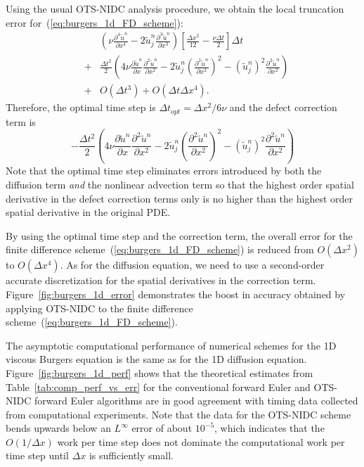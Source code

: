 \documentclass[fleqn,12pt,twoside]{article}
\newcommand{\beq}{\begin{equation}}
\newcommand{\eeq}{\end{equation}}
\newcommand{\bea}{\begin{eqnarray}}
\newcommand{\eea}{\end{eqnarray}}
\def\px{\partial x}
\def\tu{\tilde{u}}
\def\dt{\Delta t}
\def\dx{\Delta x}
\def\dto{\dt_{opt}}
\begin{document}
Using the usual OTS-NIDC analysis procedure, we obtain the local truncation
error for~(\ref{eq:burgers_1d_FD_scheme}): 
\bea
  & &
      \left( \nu \frac{\partial^4 \tu^n}{\px^4} 
           - 2 \tu^n_j \frac{\partial^3 \tu^n}{\px^3} \right)
      \left[ \frac{\dx^2}{12} - \frac{\nu \dt}{2}  \right] \dt
  \nonumber \\
  &+& \frac{\dt^2}{2} 
      \left( 
           4 \nu \frac{\partial \tu^n}{\px} \frac{\partial^2 \tu^n}{\px^2}
         - 2 \tu^n_j \left( \frac{\partial^2 \tu^n}{\px^2} \right)^2
         - \left(\tu^n_j\right)^2 \frac{\partial^2 \tu^n}{\px^2}
      \right) 
  \nonumber \\
  &+& O(\dt^3) + O(\dt \dx^4).
  \label{eq:burgers_1d_err_eqn}
\eea
Therefore, the optimal time step is $\dto = \dx^2/6\nu$ and the defect 
correction term is
\beq
  - \frac{\dt^2}{2} 
      \left( 
           4 \nu \frac{\partial \tu^n}{\px} \frac{\partial^2 \tu^n}{\px^2}
         - 2 \tu^n_j \left( \frac{\partial^2 \tu^n}{\px^2} \right)^2
         - \left(\tu^n_j\right)^2 \frac{\partial^2 \tu^n}{\px^2}
      \right)
  \label{eq:burgers_1d_corr_term}
\eeq 
Note that the optimal time step eliminates errors introduced by 
both the diffusion term \emph{and} the nonlinear advection term so that 
the highest order spatial derivative in the defect correction terms only
is no higher than the highest order spatial derivative in the original PDE.

By using the optimal time step and the correction term, the overall error
for the finite difference scheme~(\ref{eq:burgers_1d_FD_scheme}) is reduced
from $O(\dx^2)$ to $O(\dx^4)$.  As for the diffusion equation, we need
to use a second-order accurate discretization for the spatial derivatives
in the correction term.  
Figure~\ref{fig:burgers_1d_error} demonstrates the boost in accuracy obtained 
by applying OTS-NIDC to the finite difference 
scheme~(\ref{eq:burgers_1d_FD_scheme}).

The asymptotic computational performance of numerical schemes for the
1D viscous Burgers equation is the same as for the 1D diffusion equation.
Figure~\ref{fig:burgers_1d_perf} shows that the theoretical estimates
from Table~\ref{tab:comp_perf_vs_err} for the conventional forward Euler and
OTS-NIDC forward Euler algorithms are in good agreement with timing data
collected from computational experiments.  Note that the data for the OTS-NIDC
scheme bends upwards below an $L^\infty$ error of about $10^{-5}$, which
indicates that the $O(1/\dx)$ work per time step does not dominate the
computational work per time step until $\dx$ is sufficiently small.
\end{document}
